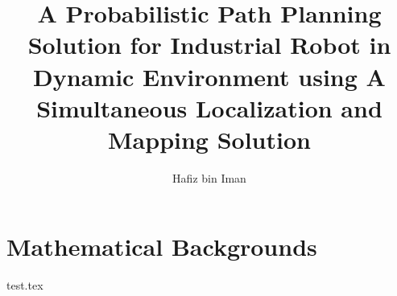 


\author{Hafiz bin Iman}
\title{A Probabilistic Path Planning Solution for Industrial Robot in Dynamic Environment using A Simultaneous Localization and Mapping Solution}

\renewcommand{\setflag}{\newif \ifwhole \wholetrue}

\maketitle
\tableofcontents
\listofalgorithms

\chapter{Mathematical Backgrounds}
{test.tex}

